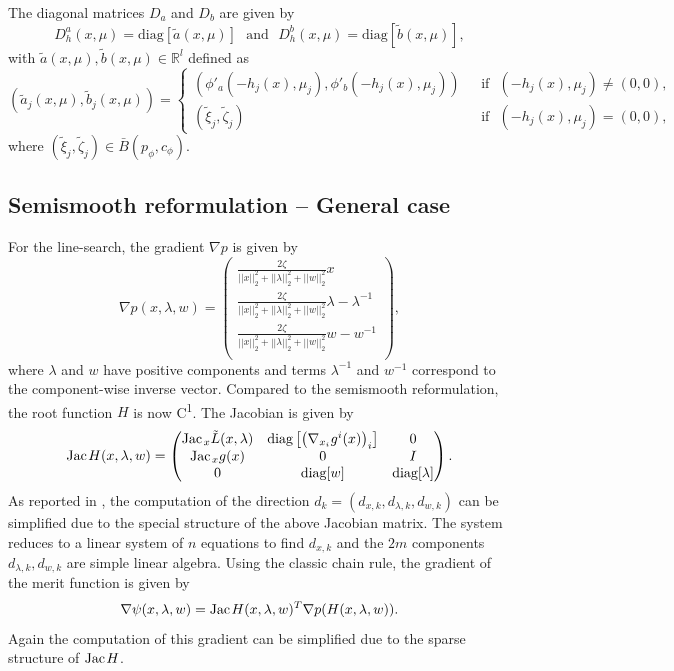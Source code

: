 \documentclass[11pt, a4paper]{article}
\newcommand{\txtm}[1]{\textrm{~~#1~~}}
\newcommand{\expo}{\textsuperscript}
\newcommand{\diag}{\textrm{diag}}
\newcommand{\Jac}{\textrm{Jac\hskip+.1em}}
\newcommand{\R}{\ensuremath{\mathbb{R}}}
\begin{document}
The diagonal matrices $D_a$ and $D_b$ are given by
$$
D_h^a(x, \mu) = \diag[ \tilde a(x, \mu) ]
\txtm{and}
D_h^b(x, \mu) = \diag[ \tilde b(x, \mu) ],
$$
with $\tilde a(x, \mu), \tilde b(x, \mu) \in \R^{l}$  defined as
$$
( \tilde a_j(x, \mu) , \tilde b_j(x, \mu) ) = 
\left\{
\begin{array}{cl} %
\left(  \phi'_a( -h_j(x), \mu_j ), \phi'_b ( -h_j(x), \mu_j ) \right) 
& \txtm{if} ( -h_j(x), \mu_j ) \neq (0, 0), \\
  (\tilde \xi_{j} ,\tilde \zeta_{j} )
& \txtm{if} ( -h_j(x), \mu_j ) = (0, 0), 
\end{array}
\right.
$$
where $(\tilde \xi_{j} , \tilde \zeta_{j} ) \in \bar B(p_\phi, c_\phi)$. 



\subsection{Semismooth reformulation -- General case\label{app:ceq:gencase}}


For the line-search, the gradient $\nabla p$  is given by
$$
\nabla p(x, \lambda, w)=
\left( \begin{matrix}
 \frac{2 \zeta }{ ||x||_2^2 + ||\lambda ||_2^2+ ||w||_2^2 } x \\
 \frac{2 \zeta }{ ||x||_2^2 + ||\lambda ||_2^2+ ||w||_2^2 } \lambda  - \lambda^{-1} \\
 \frac{2 \zeta }{ ||x||_2^2 + ||\lambda ||_2^2+ ||w||_2^2 } w  - w^{-1} \\
\end{matrix}
\right),
$$
where  $\lambda$ and $w$ have positive components and  terms $\lambda^{-1}$ and $w^{-1}$ correspond to the component-wise inverse vector.
Compared to the semismooth reformulation, the root function $H$ is now C\expo{1}. 
The Jacobian is given by 
$$
\Jac H(x, \lambda, w) = 
\left( 
\begin{matrix}
\Jac_x \tilde L(x, \lambda)  &  \diag\left[ \left( \nabla_{x_i} g^i(x) \right)_i \right]  & 0 \\
\Jac_x g(x) & 0 & I \\
0 & \diag[w] & \diag[\lambda]
\end{matrix}
\right).
$$
As reported in \cite{kanzowfacchetal11}, the computation of the direction $d_k = (d_{x, k}, d_{\lambda, k}, d_{w, k})$ can be simplified due to the special structure of the above Jacobian matrix. 
The system reduces to a linear system of $n$ equations to find $d_{x, k}$ and the $2m$ components $d_{\lambda, k}, d_{w, k}$ are simple linear algebra.
Using the classic chain rule, the gradient of the merit function is given by 
$$
\nabla \psi(x, \lambda, w) = \Jac H(x, \lambda, w)^T \nabla p(H(x, \lambda, w)).
$$
Again the computation of this gradient can be simplified due to the sparse structure of $\Jac H$.
\end{document}
